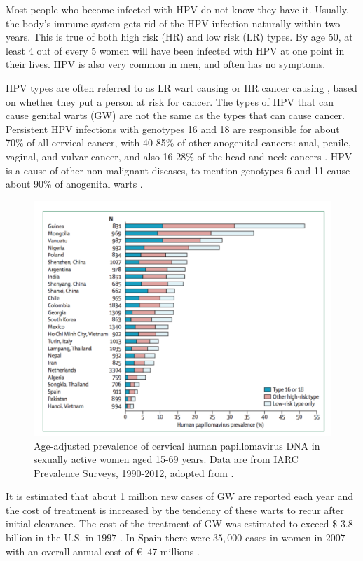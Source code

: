 Most people who become infected with HPV do not know they have it. Usually, the body's immune system gets rid of the HPV infection naturally within two years. This is true of both high risk (HR) and low risk (LR) types. By age 50, at least 4 out of every 5 women will have been infected with HPV at one point in their lives. HPV is also very common in men, and often has no symptoms.

HPV types are often referred to as LR wart causing or HR cancer causing \cite{Clifford1157}, based on whether they put a person at risk for cancer. The types of HPV that can cause genital warts (GW) are not the same as the types that can cause cancer. Persistent HPV infections with genotypes 16 and 18 are responsible for about 70\% of all cervical cancer, with 40-85\% of other anogenital cancers: anal, penile, vaginal, and vulvar cancer, and also 16-28\% of the head and neck cancers \cite{olsen2015revisiting}. HPV is a cause of other non malignant diseases, to mention genotypes 6 and 11 cause about 90\% of anogenital warts \cite{lacey2006burden}.

\begin{figure}[ht]
	\centering
	\includegraphics[scale=0.7]{IMG/prevalence.png}
	\caption{Age-adjusted prevalence of cervical human papillomavirus DNA in sexually active women aged 15-69 years. Data are from IARC Prevalence Surveys, 1990-2012, adopted from \cite{Marx1986HumanPV}.}
	\label{ageAdjusted}
\end{figure} 

It is estimated that about 1 million new cases of GW are reported each year and the cost of treatment is increased by the tendency of these warts to recur after initial clearance. The cost of the treatment of GW was estimated to exceed \$ $3.8$ billion in the U.S. in $1997$ \cite{roberts1999vaccine}. In Spain there were $35,000$ cases in women in $2007$ with an overall annual cost of \euro \ $47$ millions \cite{castellsague2012prevalence}.

